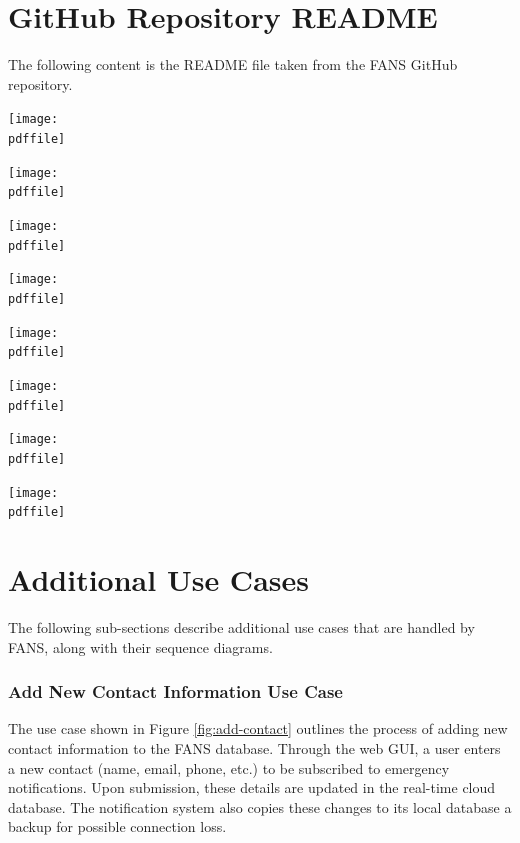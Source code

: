 \appendix

\pagebreak
\section{GitHub Repository README}

The following content is the README file taken from the FANS GitHub repository.

\def\pdffile{../../README.pdf}

\begin{center}
    \texttt{[image: \\pdffile]}

    \texttt{[image: \\pdffile]}

    \texttt{[image: \\pdffile]}

    \texttt{[image: \\pdffile]}

    \texttt{[image: \\pdffile]}

    \texttt{[image: \\pdffile]}

    \texttt{[image: \\pdffile]}

    \texttt{[image: \\pdffile]}
\end{center}

\section{Additional Use Cases} \label{ap:sequence}

The following sub-sections describe additional use cases that are handled by FANS, along with their sequence diagrams.

\subsubsection{Add New Contact Information Use Case}

The use case shown in Figure \ref{fig:add-contact} outlines the process of adding new contact information to the FANS
database. Through the web GUI, a user enters a new contact (name, email, phone, etc.) to be subscribed to emergency
notifications. Upon submission, these details are updated in the real-time cloud database. The notification system also
copies these changes to its local database a backup for possible connection loss.

